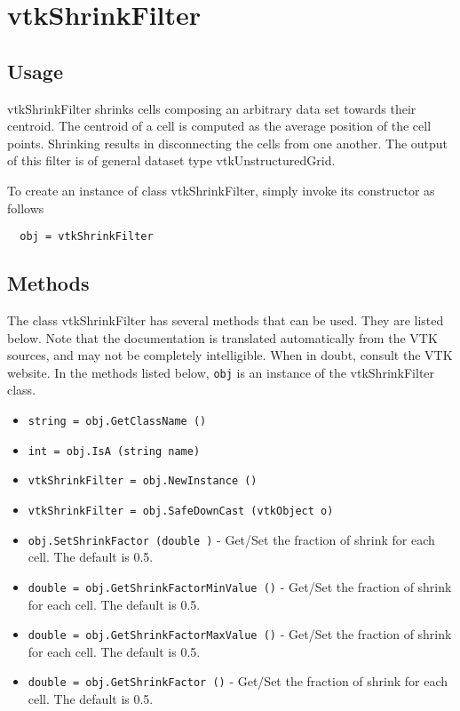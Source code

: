 \section{vtkShrinkFilter}

\subsection{Usage}

 vtkShrinkFilter shrinks cells composing an arbitrary data set
 towards their centroid. The centroid of a cell is computed as the
 average position of the cell points. Shrinking results in
 disconnecting the cells from one another. The output of this filter
 is of general dataset type vtkUnstructuredGrid.

To create an instance of class vtkShrinkFilter, simply
invoke its constructor as follows
\begin{verbatim}
  obj = vtkShrinkFilter
\end{verbatim}
\subsection{Methods}

The class vtkShrinkFilter has several methods that can be used.
  They are listed below.
Note that the documentation is translated automatically from the VTK sources,
and may not be completely intelligible.  When in doubt, consult the VTK website.
In the methods listed below, \verb|obj| is an instance of the vtkShrinkFilter class.
\begin{itemize}
\item  \verb|string = obj.GetClassName ()|

\item  \verb|int = obj.IsA (string name)|

\item  \verb|vtkShrinkFilter = obj.NewInstance ()|

\item  \verb|vtkShrinkFilter = obj.SafeDownCast (vtkObject o)|

\item  \verb|obj.SetShrinkFactor (double )| -  Get/Set the fraction of shrink for each cell. The default is 0.5.

\item  \verb|double = obj.GetShrinkFactorMinValue ()| -  Get/Set the fraction of shrink for each cell. The default is 0.5.

\item  \verb|double = obj.GetShrinkFactorMaxValue ()| -  Get/Set the fraction of shrink for each cell. The default is 0.5.

\item  \verb|double = obj.GetShrinkFactor ()| -  Get/Set the fraction of shrink for each cell. The default is 0.5.

\end{itemize}
